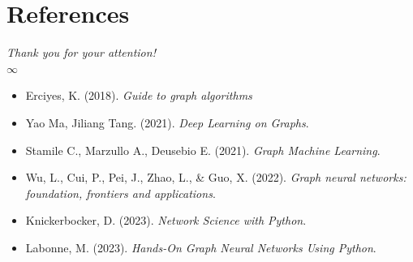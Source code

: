 \documentclass{beamer}
\begin{document}
\section*{References}
    \begin{frame}
        \begin{center}
            {\Huge\textit{Thank you for your attention!}}\\
            {\Huge $\infty$} \\
        \end{center}
    \end{frame}
    
    \begin{frame}[allowframebreaks]
        \small %
        
        \begin{itemize}
            \item Erciyes, K. (2018). \textit{Guide to graph algorithms} %
            \item Yao Ma, Jiliang Tang. (2021). \textit{Deep Learning on Graphs}.
            \item Stamile C., Marzullo A., Deusebio E. (2021). \textit{Graph Machine Learning}.
            \item Wu, L., Cui, P., Pei, J., Zhao, L., \& Guo, X. (2022). \textit{Graph neural networks: foundation, frontiers and applications}. %
            \item Knickerbocker, D. (2023). \textit{Network Science with Python}. %
            \item Labonne, M. (2023). \textit{Hands-On Graph Neural Networks Using Python}.
        \end{itemize}
    \end{frame}
\end{document}
